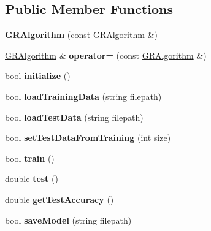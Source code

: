 \subsection*{Public Member Functions}
\begin{DoxyCompactItemize}
\item 
\mbox{\label{classGRAlgorithm_ad507e4837f87aa62d71dcecdca81529e}} 
{\bfseries G\+R\+Algorithm} (const \mbox{\hyperlink{classGRAlgorithm}{G\+R\+Algorithm}} \&)
\item 
\mbox{\label{classGRAlgorithm_ac8f0e0ed3d860d09ca75159efa4b33fa}} 
\mbox{\hyperlink{classGRAlgorithm}{G\+R\+Algorithm}} \& {\bfseries operator=} (const \mbox{\hyperlink{classGRAlgorithm}{G\+R\+Algorithm}} \&)
\item 
\mbox{\label{classGRAlgorithm_a4e12e396572fafdf41521f722ab93917}} 
bool {\bfseries initialize} ()
\item 
\mbox{\label{classGRAlgorithm_a8bd083f1f8ae4755d4a0d61f5f9af9c5}} 
bool {\bfseries load\+Training\+Data} (string filepath)
\item 
\mbox{\label{classGRAlgorithm_a95f73dc234b1d409ae20a567b69a2d6e}} 
bool {\bfseries load\+Test\+Data} (string filepath)
\item 
\mbox{\label{classGRAlgorithm_a83bb8a0cb75f8a132911338ae452f6fd}} 
bool {\bfseries set\+Test\+Data\+From\+Training} (int size)
\item 
\mbox{\label{classGRAlgorithm_a71fbc973a3e393acc2f52bb00620a0de}} 
bool {\bfseries train} ()
\item 
\mbox{\label{classGRAlgorithm_abbf4214b22afe9fefe6116221abf8e92}} 
double {\bfseries test} ()
\item 
\mbox{\label{classGRAlgorithm_abe963e284117ead1bd2c733eee11d18a}} 
double {\bfseries get\+Test\+Accuracy} ()
\item 
\mbox{\label{classGRAlgorithm_ad1c13253aa7e3ca47c474dbf922fc7e1}} 
bool {\bfseries save\+Model} (string filepath)

\end{DoxyCompactItemize}
